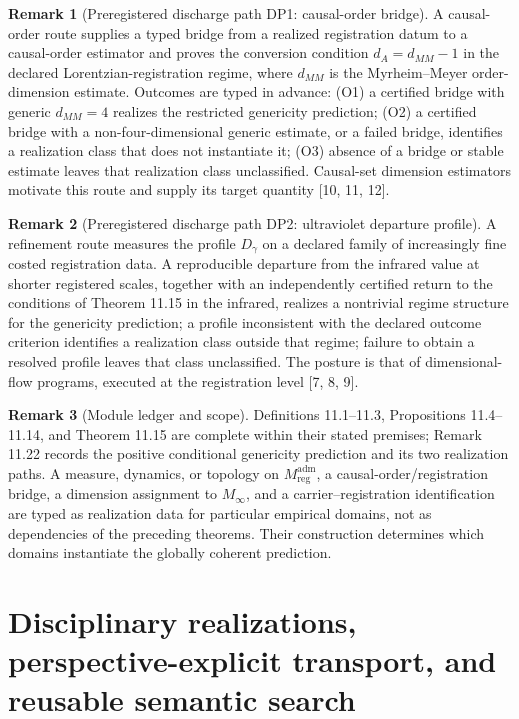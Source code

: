 \documentclass[11pt]{article}
\theoremstyle{definition}
\newtheorem{remark}{Remark}
\newcommand{\Minf}{M_\infty}
\begin{document}
\begin{remark}[Preregistered discharge path DP1: causal-order bridge]
A causal-order route supplies a typed bridge from a realized registration datum to a causal-order estimator and proves the conversion condition $d_A = d_{MM} - 1$ in the declared Lorentzian-registration regime, where $d_{MM}$ is the Myrheim--Meyer order-dimension estimate. Outcomes are typed in advance: (O1) a certified bridge with generic $d_{MM} = 4$ realizes the restricted genericity prediction; (O2) a certified bridge with a non-four-dimensional generic estimate, or a failed bridge, identifies a realization class that does not instantiate it; (O3) absence of a bridge or stable estimate leaves that realization class unclassified. Causal-set dimension estimators motivate this route and supply its target quantity [10, 11, 12].
\end{remark}

\begin{remark}[Preregistered discharge path DP2: ultraviolet departure profile]
A refinement route measures the profile $D_\gamma$ on a declared family of increasingly fine costed registration data. A reproducible departure from the infrared value at shorter registered scales, together with an independently certified return to the conditions of Theorem 11.15 in the infrared, realizes a nontrivial regime structure for the genericity prediction; a profile inconsistent with the declared outcome criterion identifies a realization class outside that regime; failure to obtain a resolved profile leaves that class unclassified. The posture is that of dimensional-flow programs, executed at the registration level [7, 8, 9].
\end{remark}

\begin{remark}[Module ledger and scope]
Definitions 11.1--11.3, Propositions 11.4--11.14, and Theorem 11.15 are complete within their stated premises; Remark 11.22 records the positive conditional genericity prediction and its two realization paths. A measure, dynamics, or topology on $M^{\mathrm{adm}}_{\mathrm{reg}}$, a causal-order/registration bridge, a dimension assignment to $\Minf$, and a carrier--registration identification are typed as realization data for particular empirical domains, not as dependencies of the preceding theorems. Their construction determines which domains instantiate the globally coherent prediction.
\end{remark}

\section{Disciplinary realizations, perspective-explicit transport, and reusable semantic search}
\end{document}
